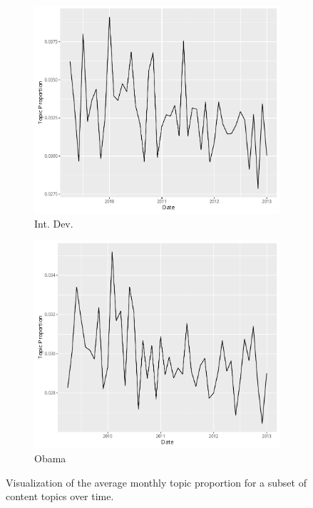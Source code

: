 \documentclass[12pt]{article}
\theoremstyle{definition}
\theoremstyle{algodesc}
\begin{document}
\begin{figure}[h]
\begin{subfigure}[Int. Dev.]{.30\linewidth}
    \includegraphics[width=\linewidth]{../images/time_plot23.pdf}
    \caption{Int. Dev.} \label{fig:t5}
\end{subfigure}
\begin{subfigure}[Obama]{.30\linewidth}
    \includegraphics[width=\linewidth]{../images/time_plot25.pdf}
    \caption{Obama} \label{fig:t6}
\end{subfigure}
\caption{Visualization of the average monthly topic proportion for a subset of content topics over time.}
\label{fig:topic_time_plots}
\end{figure}
\end{document}
